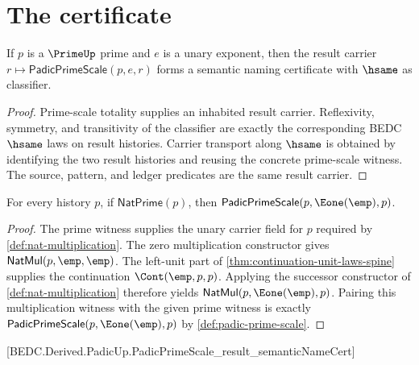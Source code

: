 \section{The certificate}
\label{sec:padic-certificate}

\begin{theorem}
\label{thm:padic-prime-scale-result-semantic-namecert}
If $p$ is a $\PrimeUp$ prime and $e$ is a unary exponent, then the result
carrier $r\mapsto\mathsf{PadicPrimeScale}(p,e,r)$ forms a semantic naming
certificate with $\hsame$ as classifier.
\end{theorem}
\begin{proof}
Prime-scale totality supplies an inhabited result carrier. Reflexivity,
symmetry, and transitivity of the classifier are exactly the corresponding
BEDC $\hsame$ laws on result histories. Carrier transport along $\hsame$ is
obtained by identifying the two result histories and reusing the concrete
prime-scale witness. The source, pattern, and ledger predicates are the same
result carrier.
\end{proof}
\begin{theorem}
\label{thm:padic-prime-scale-unit-exponent-reads-back-prime}
For every history $p$, if $\mathsf{NatPrime}(p)$, then
$\mathsf{PadicPrimeScale}(p,\Eone(\emp),p)$.
\end{theorem}
\begin{proof}
The prime witness supplies the unary carrier field for $p$ required by
\autoref{def:nat-multiplication}. The zero multiplication constructor gives
$\mathsf{NatMul}(p,\emp,\emp)$. The left-unit part of
\autoref{thm:continuation-unit-laws-spine} supplies the continuation
$\Cont(\emp,p,p)$. Applying the successor constructor of
\autoref{def:nat-multiplication} therefore yields
$\mathsf{NatMul}(p,\Eone(\emp),p)$. Pairing this multiplication witness with
the given prime witness is exactly
$\mathsf{PadicPrimeScale}(p,\Eone(\emp),p)$ by
\autoref{def:padic-prime-scale}.
\end{proof}



[BEDC.Derived.PadicUp.PadicPrimeScale\_result\_semanticNameCert]

